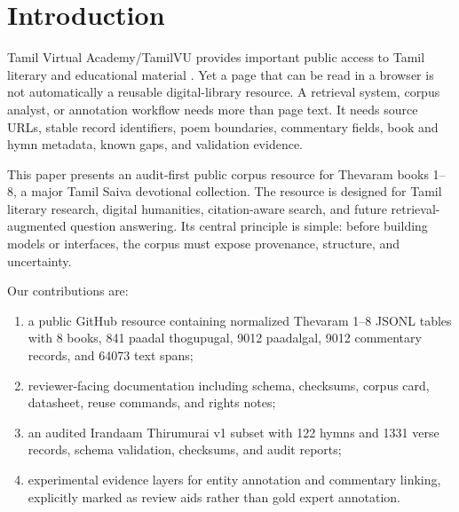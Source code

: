 \documentclass[sigconf]{acmart}
\begin{document}


\maketitle

\section{Introduction}

Tamil Virtual Academy/TamilVU provides important public access to Tamil literary and educational material \cite{tamilvu,tamilvulibrary}. Yet a page that can be read in a browser is not automatically a reusable digital-library resource. A retrieval system, corpus analyst, or annotation workflow needs more than page text. It needs source URLs, stable record identifiers, poem boundaries, commentary fields, book and hymn metadata, known gaps, and validation evidence.

This paper presents an audit-first public corpus resource for Thevaram books 1--8, a major Tamil Saiva devotional collection. The resource is designed for Tamil literary research, digital humanities, citation-aware search, and future retrieval-augmented question answering. Its central principle is simple: before building models or interfaces, the corpus must expose provenance, structure, and uncertainty.

Our contributions are:

\begin{enumerate}
  \item a public GitHub resource containing normalized Thevaram 1--8 JSONL tables with 8 books, 841 paadal thogupugal, 9012 paadalgal, 9012 commentary records, and 64073 text spans;
  \item reviewer-facing documentation including schema, checksums, corpus card, datasheet, reuse commands, and rights notes;
  \item an audited Irandaam Thirumurai v1 subset with 122 hymns and 1331 verse records, schema validation, checksums, and audit reports;
  \item experimental evidence layers for entity annotation and commentary linking, explicitly marked as review aids rather than gold expert annotation.
\end{enumerate}
\end{document}
